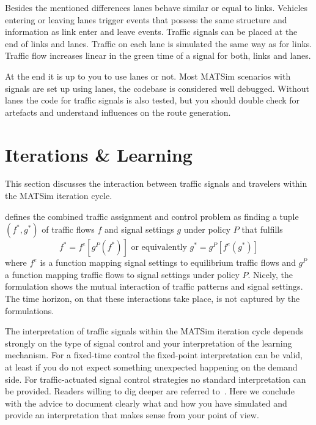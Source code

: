 Besides the mentioned differences lanes behave similar or equal to links.  
Vehicles entering or leaving lanes trigger events that possess the same structure and information as link enter and leave events.
Traffic signals can be placed at the end of links and lanes. 
Traffic on each lane is simulated the same way as for links. 
Traffic flow increases linear in the green time of a signal for both, links and lanes. 

At the end it is up to you to use lanes or not. 
Most MATSim scenarios with signals are set up using lanes, the codebase is considered well debugged. 
Without lanes the code for traffic signals is also tested, but you should double check for artefacts and understand influences on the route generation. 

\section{Iterations \& Learning}
\label{sec:signals_iterations_learning}

This section discusses the interaction between traffic signals and travelers within the MATSim iteration cycle. 

\citet{Meneguzzer1997ModelReviewTrafficAssignmentSignalControl} defines the combined traffic assignment and control problem as finding a tuple $(f^{*}, g^{*})$ of traffic flows $f$ and signal settings $g$ under policy $P$ that fulfills  
\[
f^{*} = f^{e}[g^{P}(f^{*})] \mbox{  or  equivalently } g^{*} = g^{P}[f^{e}(g^{*})]
\]
where $f^{e}$ is a function mapping signal settings to equilibrium traffic flows and $g^{P}$ a function mapping traffic flows to signal settings under policy $P$.  
Nicely, the formulation shows the mutual interaction of traffic patterns and signal settings. 
The time horizon, on that these interactions take place, is not captured by the formulations. 

The interpretation of traffic signals within the MATSim iteration cycle depends strongly on the type of signal control and your interpretation of the learning mechanism. 
For a fixed-time control the fixed-point interpretation can be valid, at least if you do not expect something unexpected happening on the demand side. 
For traffic-actuated signal control strategies no standard interpretation can be provided. 
Readers willing to dig deeper are referred to~\citet[][pp.~75]{Grether2014PhD}.  
Here we conclude with the advice to document clearly what and how you have simulated and provide an interpretation that makes sense from your point of view.    

